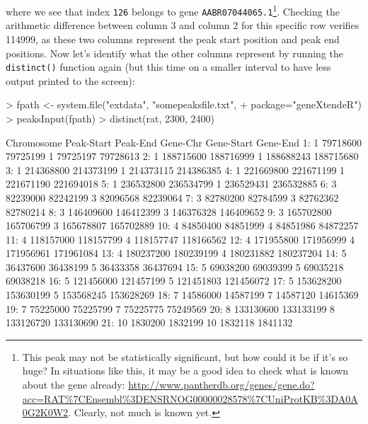 \documentclass[12pt]{article}
\begin{document}
where we see that index \texttt{126} belongs to gene \texttt{AABR07044065.1}\footnote{This peak may not be statistically significant, but how could it be if it's so huge?  In situations like this, it may be a good idea to check what is known about the gene already: \url{http://www.pantherdb.org/genes/gene.do?acc=RAT\%7CEnsembl\%3DENSRNOG00000028578\%7CUniProtKB\%3DA0A0G2K0W2}.  Clearly, not much is known yet.}.  Checking the arithmetic difference between column 3 and column 2 for this specific row verifies 114999, as these two columns represent the peak start position and peak end positions.  Now let's identify what the other columns represent by running the \texttt{distinct()} function again (but this time on a smaller interval to have less output printed to the screen):    

\begin{Schunk}
\begin{Sinput}
> fpath <- system.file("extdata", "somepeaksfile.txt", 
+                      package="geneXtendeR")
> peaksInput(fpath)
> distinct(rat, 2300, 2400)
\end{Sinput}
\begin{Soutput}
    Chromosome Peak-Start  Peak-End Gene-Chr Gene-Start  Gene-End
 1:          1   79718600  79725199        1   79725197  79728613
 2:          1  188715600 188716999        1  188688243 188715680
 3:          1  214368800 214373199        1  214373115 214386385
 4:          1  221669800 221671199        1  221671190 221694018
 5:          1  236532800 236534799        1  236529431 236532885
 6:          3   82239000  82242199        3   82096568  82239064
 7:          3   82780200  82784599        3   82762362  82780214
 8:          3  146409600 146412399        3  146376328 146409652
 9:          3  165702800 165706799        3  165678807 165702889
10:          4   84850400  84851999        4   84851986  84872257
11:          4  118157000 118157799        4  118157747 118166562
12:          4  171955800 171956999        4  171956961 171961084
13:          4  180237200 180239199        4  180231882 180237204
14:          5   36437600  36438199        5   36433358  36437694
15:          5   69038200  69039399        5   69035218  69038218
16:          5  121456000 121457199        5  121451803 121456072
17:          5  153628200 153630199        5  153568245 153628269
18:          7   14586000  14587199        7   14587120  14615369
19:          7   75225000  75225799        7   75225775  75249569
20:          8  133130600 133133199        8  133126720 133130690
21:         10    1830200   1832199       10    1832118   1841132

\end{Soutput}
\end{Schunk}
\end{document}
